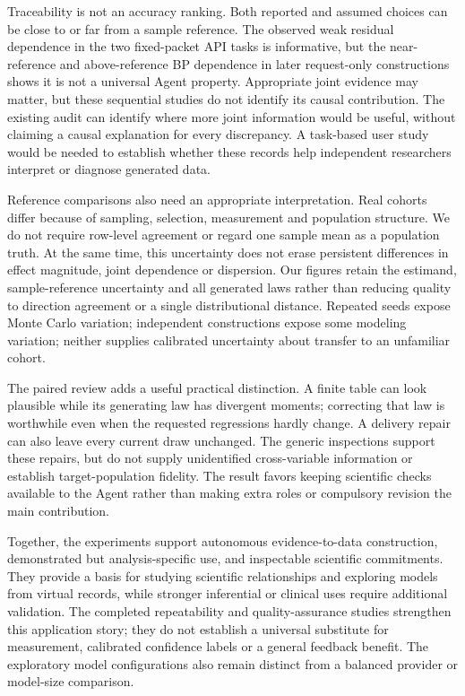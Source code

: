 \documentclass[11pt,letterpaper]{article}
\begin{document}
Traceability is not an accuracy ranking. Both reported and assumed choices can be close to or far from a sample reference. The observed weak residual dependence in the two fixed-packet API tasks is informative, but the near-reference and above-reference BP dependence in later request-only constructions shows it is not a universal Agent property. Appropriate joint evidence may matter, but these sequential studies do not identify its causal contribution. The existing audit can identify where more joint information would be useful, without claiming a causal explanation for every discrepancy. A task-based user study would be needed to establish whether these records help independent researchers interpret or diagnose generated data.


Reference comparisons also need an appropriate interpretation. Real cohorts differ because of sampling, selection, measurement and population structure. We do not require row-level agreement or regard one sample mean as a population truth. At the same time, this uncertainty does not erase persistent differences in effect magnitude, joint dependence or dispersion. Our figures retain the estimand, sample-reference uncertainty and all generated laws rather than reducing quality to direction agreement or a single distributional distance. Repeated seeds expose Monte Carlo variation; independent constructions expose some modeling variation; neither supplies calibrated uncertainty about transfer to an unfamiliar cohort.


The paired review adds a useful practical distinction. A finite table can look plausible while its generating law has divergent moments; correcting that law is worthwhile even when the requested regressions hardly change. A delivery repair can also leave every current draw unchanged. The generic inspections support these repairs, but do not supply unidentified cross-variable information or establish target-population fidelity. The result favors keeping scientific checks available to the Agent rather than making extra roles or compulsory revision the main contribution.


Together, the experiments support autonomous evidence-to-data construction, demonstrated but analysis-specific use, and inspectable scientific commitments. They provide a basis for studying scientific relationships and exploring models from virtual records, while stronger inferential or clinical uses require additional validation. The completed repeatability and quality-assurance studies strengthen this application story; they do not establish a universal substitute for measurement, calibrated confidence labels or a general feedback benefit. The exploratory model configurations also remain distinct from a balanced provider or model-size comparison.
\end{document}
